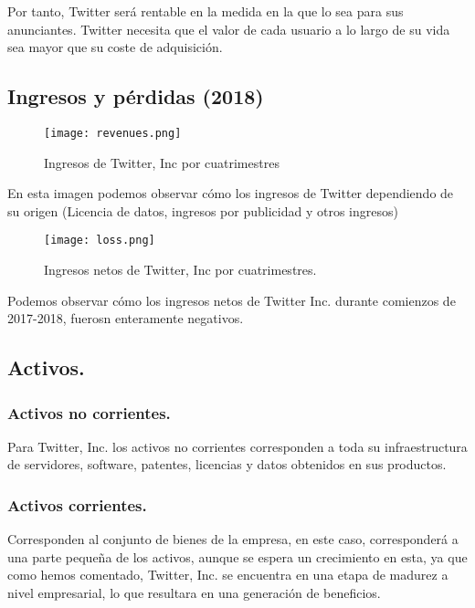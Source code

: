 Por tanto, Twitter será rentable en la medida en la que lo sea para sus anunciantes.
Twitter necesita que el valor de cada usuario a lo largo de su vida sea mayor que su coste de adquisición.

\newpage

\subsection{Ingresos y pérdidas (2018)}

\begin{figure}[!htb]
\centering
\texttt{[image: revenues.png]}
\caption{\label{fig:frog}Ingresos de Twitter, Inc por cuatrimestres}
\end{figure}

En esta imagen podemos observar cómo los ingresos de Twitter dependiendo de su origen (Licencia de datos, ingresos por publicidad y otros ingresos)


\begin{figure}[!htb]
\centering
\texttt{[image: loss.png]}
\caption{\label{fig:frog}Ingresos netos de Twitter, Inc por cuatrimestres.}
\end{figure}


Podemos observar cómo los ingresos netos de Twitter Inc. durante comienzos de 2017-2018, fuerosn enteramente negativos.

\subsection{Activos.}

\subsubsection{Activos no corrientes.}

Para Twitter, Inc. los activos no corrientes corresponden a toda su infraestructura de servidores, software, patentes, licencias y datos obtenidos en sus productos.

\subsubsection{Activos corrientes.}

Corresponden al conjunto de bienes de la empresa, en este caso, corresponderá a una parte pequeña de los activos, aunque se espera un crecimiento en esta, ya que como hemos comentado, Twitter, Inc. se encuentra en una etapa de madurez a nivel empresarial, lo que resultara en una generación de beneficios.


